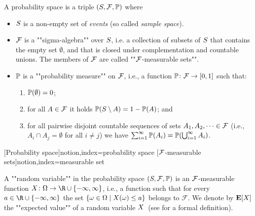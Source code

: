 \begin{definition}
\label{5-def:probspace}
A probability space is a triple
$(S,\mathcal{F},\mathbb{P})$ where
\begin{itemize}
\item
$S$ is a non-empty set of \emph{events} (so called
\emph{sample space}). 

\item
$\mathcal{F}$ is a ""sigma-algebra"" over $S$,
i.e. a collection of subsets of $S$ that contains the empty set
$\emptyset$, and that is closed under complementation and countable unions. The members of $\mathcal{F}$ are called ""$\mathcal{F}$-measurable 
sets"".

\item
$\mathbb{P}$ is a ""probability measure"" on $\mathcal{F}$, i.e., a function
$\mathbb{P}\colon \mathcal{F}\rightarrow[0,1]$ such that:
\begin{enumerate}
\item
$\mathbb{P}(\emptyset)=0$;

\item
for all $A\in \mathcal{F}$ it holds $\mathbb{P}(S \setminus
A)=1-\mathbb{P}(A)$; and

\item
for all pairwise disjoint countable sequences of sets $A_1,A_2,\dots \in \mathcal{F}$ (i.e., $A_i \cap A_j = \emptyset$ for all $i\neq j$)
we have $\sum_{i=1}^{\infty}\mathbb{P}(A_i)=\mathbb{P}(\bigcup_{i=1}^{\infty} A_i)$.
\end{enumerate}
\end{itemize}
\end{definition}

[Probability space]{notion,index={probability space}}
[$\mathcal{F}$-measurable 
sets]{notion,index={measurable set}}

A ""random variable"" in the probability space $(S,\mathcal{F},\mathbb{P})$ is an $\mathcal{F}$-measurable function $\rvar\colon \Omega \rightarrow \R \cup
\{-\infty,\infty\}$, i.e.,
a function such that for every $a\in \R \cup \{ -\infty,\infty\}$ the set
$\{\omega\in \Omega\mid X(\omega)\leq a\}$ belongs to $\mathcal{F}$. We denote by $\mathbf{E}[X]$ the ""expected value"" of a random variable $X$~(see \cite[Chapter 5]{Bil:1995}
for a formal definition).


